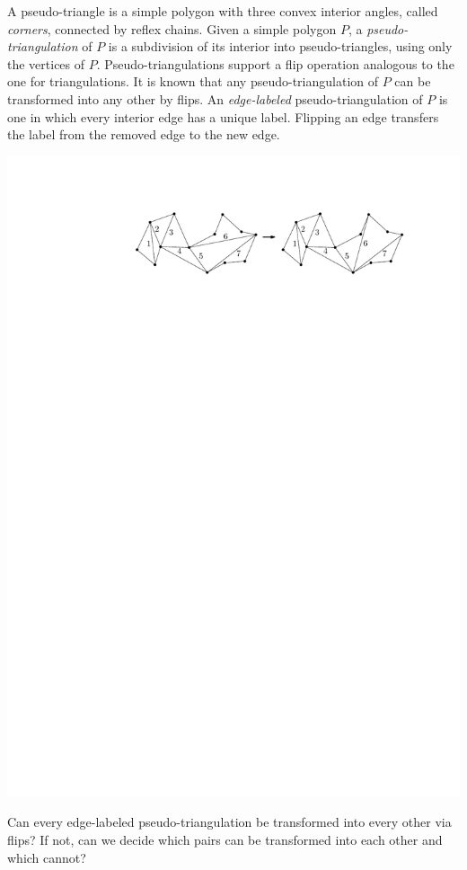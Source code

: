 \documentclass{patmorin}
\begin{document}
A pseudo-triangle is a simple polygon with three convex interior
angles, called \emph{corners}, connected by reflex chains.
Given a simple polygon $P$, a \emph{pseudo-triangulation} of $P$ is a
subdivision of its interior into pseudo-triangles, using only the
vertices of $P$.
Pseudo-triangulations support a flip operation analogous to the one
for triangulations.
It is known that any pseudo-triangulation of $P$ can be transformed
into any other by flips.
An \emph{edge-labeled} pseudo-triangulation of $P$ is one in which
every interior edge has a unique label.
Flipping an edge transfers the label from the removed edge to the new
edge.

\begin{center}
  \includegraphics{figs/edge-flip.pdf}
\end{center}
 
\begin{op}
  Can every edge-labeled pseudo-triangulation be transformed into every
other via flips? If not, can we decide which pairs can be transformed
into each other and which cannot?
\end{op}
\end{document}
